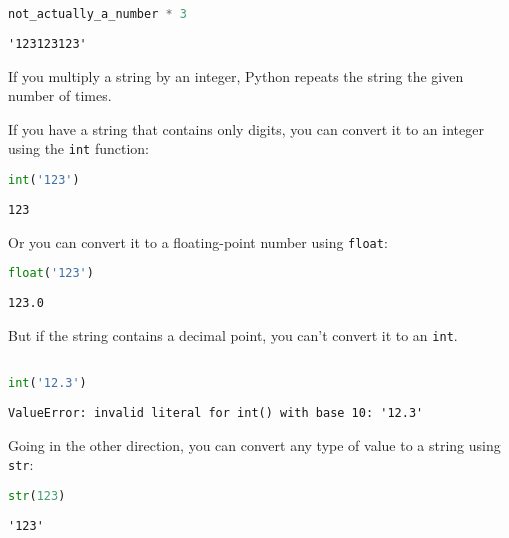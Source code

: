 \begin{lstlisting}[language=Python,style=source]
not_actually_a_number * 3
\end{lstlisting}

\begin{lstlisting}[style=output]
'123123123'
\end{lstlisting}

If you multiply a string by an integer, Python repeats the string the
given number of times.

If you have a string that contains only digits, you can convert it to an
integer using the \passthrough{\lstinline!int!} function:

\begin{lstlisting}[language=Python,style=source]
int('123')
\end{lstlisting}

\begin{lstlisting}[style=output]
123
\end{lstlisting}

Or you can convert it to a floating-point number using
\passthrough{\lstinline!float!}:

\begin{lstlisting}[language=Python,style=source]
float('123')
\end{lstlisting}

\begin{lstlisting}[style=output]
123.0
\end{lstlisting}

But if the string contains a decimal point, you can't convert it to an
\passthrough{\lstinline!int!}.

\begin{lstlisting}[language=Python,style=source]
%%expect ValueError

int('12.3')
\end{lstlisting}

\begin{lstlisting}[style=output]
ValueError: invalid literal for int() with base 10: '12.3'
\end{lstlisting}

Going in the other direction, you can convert any type of value to a
string using \passthrough{\lstinline!str!}:

\begin{lstlisting}[language=Python,style=source]
str(123)
\end{lstlisting}

\begin{lstlisting}[style=output]
'123'
\end{lstlisting}

